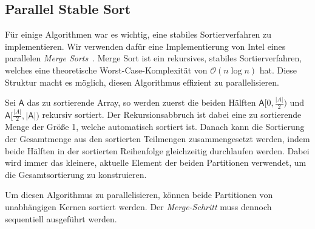 \subsection{Parallel Stable Sort}
\label{section:pss}

Für einige Algorithmen war es wichtig, eine stabiles Sortierverfahren zu implementieren.
Wir verwenden dafür eine Implementierung von Intel\textregistered{} eines parallelen \emph{Merge Sorts}~\cite{pss_intel}.
Merge Sort ist ein rekursives, stabiles Sortierverfahren, welches eine theoretische Worst-Case-Komplexität von $\mathcal O (n \log n)$ hat.
Diese Struktur macht es möglich, diesen Algorithmus effizient zu parallelisieren.

Sei $\mathsf A$ das zu sortierende Array, so werden zuerst die beiden
Hälften $\mathsf A[0, \frac{|A|}{2})$ und $\mathsf A[\frac{|A|}{2}, |\mathsf A|)$ rekursiv sortiert.
Der Rekursionsabbruch ist dabei eine zu sortierende Menge der Größe 1, welche automatisch sortiert ist.
Danach kann die Sortierung der Gesamtmenge aus den sortierten Teilmengen zusammengesetzt werden,
indem beide Hälften in der sortierten Reihenfolge gleichzeitig durchlaufen werden.
Dabei wird immer das kleinere, aktuelle Element der beiden Partitionen verwendet,
um die Gesamtsortierung zu konstruieren.

Um diesen Algorithmus zu parallelisieren,
können beide Partitionen von unabhängigen Kernen sortiert werden.
Der \emph{Merge-Schritt} muss dennoch sequentiell ausgeführt werden.